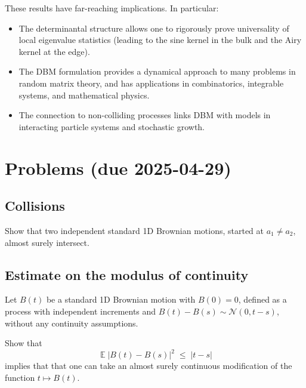 \documentclass[letterpaper,11pt,oneside,reqno]{article}
\numberwithin{equation}{section}
\theoremstyle{definition}
\begin{document}
These results have far-reaching implications. In particular:
\begin{itemize}
    \item The determinantal structure allows one to rigorously prove universality of local eigenvalue statistics (leading to the sine kernel in the bulk and the Airy kernel at the edge).
    \item The DBM formulation provides a dynamical approach to many problems in random matrix theory, and has applications in combinatorics, integrable systems, and mathematical physics.
    \item The connection to non-colliding processes links DBM with models in interacting particle systems and stochastic growth.
\end{itemize}

















\appendix
\setcounter{section}{9}
\section{Problems (due 2025-04-29)}

\subsection{Collisions}

Show that two independent standard 1D Brownian motions, started at $a_1\neq a_2$, almost surely intersect.

\subsection{Estimate on the modulus of continuity}

Let $B(t)$ be a standard 1D Brownian motion with $B(0)=0$,
defined as a process with independent increments and $B(t)-B(s)\sim \mathcal{N}(0,t-s)$,
without any continuity assumptions.

Show that
\begin{equation*}
	\operatorname{\mathbb{E}}|B(t)-B(s)|^2 \;\le\; |t-s|
\end{equation*}
implies that
that one can take an almost
surely continuous modification of the function $t\mapsto B(t)$.
\end{document}
